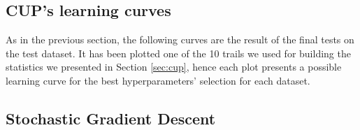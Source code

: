\begin{appendices}




    \chapter{CUP's learning curves} %
    \label{cha:cup_learning_curves}
        As in the previous section, the following curves are the result of the final tests on the test dataset. It has been plotted one of the 10 trails we used for building the statistics we presented in Section \ref{sec:cup}, hence each plot presents a possible learning curve for the best hyperparameters’ selection for each dataset.
        \section{Stochastic Gradient Descent} %
        \label{sec:cup_sgd}



\end{appendices}
